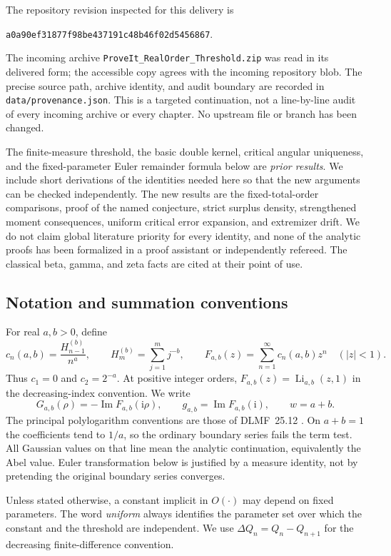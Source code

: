 \documentclass[11pt]{article}
\numberwithin{equation}{section}
\theoremstyle{definition}\newtheorem{definition}[theorem]{Definition}
\theoremstyle{remark}\newtheorem{remark}[theorem]{Remark}
\newcommand{\ii}{\mathrm i}
\DeclareMathOperator{\Li}{Li}
\DeclareMathOperator{\Impart}{Im}
\newcommand{\basecommit}{\nolinkurl{a0a90ef31877f98be437191c48b46f02d5456867}}
\begin{document}
The repository revision inspected for this delivery is
\begin{center}\small\basecommit.\end{center}
The incoming archive \texttt{ProveIt\_RealOrder\_Threshold.zip} was read
in its delivered form; the accessible copy agrees with the incoming
repository blob. The precise source path, archive identity, and audit
boundary are recorded in \texttt{data/provenance.json}. This is a targeted
continuation, not a line-by-line audit of every incoming archive or every
chapter. No upstream file or branch has been changed.

The finite-measure threshold, the basic double kernel, critical angular
uniqueness, and the fixed-parameter Euler remainder formula below are
\emph{prior results}. We include short derivations of the identities needed
here so that the new arguments can be checked independently. The new
results are the fixed-total-order comparisons, proof of the named
conjecture, strict surplus density, strengthened moment consequences,
uniform critical error expansion, and extremizer drift. We do not claim
global literature priority for every identity, and none of the analytic
proofs has been formalized in a proof assistant or independently refereed.
The classical beta, gamma, and zeta facts are cited at their point of use.

\subsection{Notation and summation conventions}
For real $a,b>0$, define
\begin{equation}\label{eq:def}
 c_n(a,b)=\frac{H_{n-1}^{(b)}}{n^a},\qquad
 H_m^{(b)}=\sum_{j=1}^m j^{-b},\qquad
 F_{a,b}(z)=\sum_{n=1}^\infty c_n(a,b)z^n\quad(|z|<1).
\end{equation}
Thus $c_1=0$ and $c_2=2^{-a}$. At positive integer orders,
$F_{a,b}(z)=\Li_{a,b}(z,1)$ in the decreasing-index convention.
We write
\[
 G_{a,b}(\rho)=-\Impart F_{a,b}(\ii\rho),\qquad
 g_{a,b}=\Impart F_{a,b}(\ii),\qquad w=a+b.
\]
The principal polylogarithm conventions are those of DLMF~25.12
\cite{dlmf-polylog}. On $a+b=1$ the coefficients tend to $1/a$, so the
ordinary boundary series fails the term test. All Gaussian values on
that line mean the analytic continuation, equivalently the Abel value.
Euler transformation below is justified by a measure identity, not by
pretending the original boundary series converges.

Unless stated otherwise, a constant implicit in $O(\cdot)$ may depend on
fixed parameters. The word \emph{uniform} always identifies the parameter
set over which the constant and the threshold are independent. We use
$\Delta Q_n=Q_n-Q_{n+1}$ for the decreasing finite-difference convention.
\end{document}
